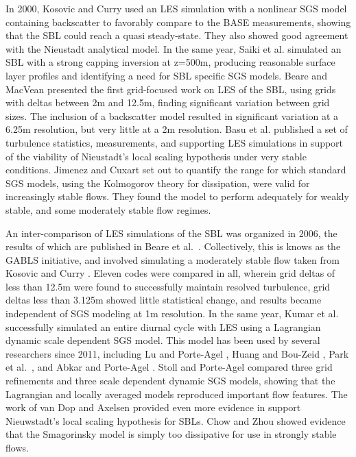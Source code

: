 \documentclass[conf]{new-aiaa}
\begin{document}
In 2000, Kosovic and Curry \cite{Kosovic2000} used an LES simulation with a nonlinear SGS 
model containing backscatter to favorably compare to the BASE measurements, showing that 
the SBL could reach a quasi steady-state. They also showed good agreement with the Nieustadt 
analytical model. In the same year, Saiki et al. \cite{Saiki2000} simulated an SBL with 
a strong capping inversion at z=500m, producing reasonable surface layer profiles and 
identifying a need for SBL specific SGS models. Beare and MacVean \cite{Beare2004} 
presented the first grid-focused work on LES of the SBL, using grids with deltas 
between 2m and 12.5m, finding significant variation between grid sizes. The inclusion 
of a backscatter model resulted in significant variation at a 6.25m resolution, but 
very little at a 2m resolution. Basu et al. \cite{Basu2005} published a set of 
turbulence statistics, measurements, and supporting LES simulations in support 
of the viability of Nieustadt's local scaling hypothesis under very stable 
conditions. Jimenez and Cuxart \cite{Jimenez2005} set out to quantify the range 
for which standard SGS models, using the Kolmogorov theory for dissipation, were 
valid for increasingly stable flows. They found the model to perform adequately 
for weakly stable, and some moderately stable flow regimes. 

An inter-comparison of LES simulations of the SBL was organized in 2006, the 
results of which are published in Beare et al.\ \cite{Beare2006}. Collectively, 
this is knows as the GABLS initiative, and involved simulating a moderately 
stable flow taken from Kosovic and Curry \cite{Kosovic2000}. Eleven codes 
were compared in all, wherein grid deltas of less than 12.5m were found to 
successfully maintain resolved turbulence, grid deltas less than 3.125m 
showed little statistical change, and results became independent of SGS 
modeling at 1m resolution. In the same year, Kumar et al. \cite{Kumar2006} 
successfully simulated an entire diurnal cycle with LES using a Lagrangian 
dynamic scale dependent SGS model. This model has been used by several 
researchers since 2011, including Lu and Porte-Agel \cite{Lu2011}, Huang 
and Bou-Zeid \cite{Huang2013}, Park et al.\ \cite{Park2014}, and 
Abkar and Porte-Agel \cite{Abkar2015}. Stoll and Porte-Agel \cite{Stoll2007} 
compared three grid refinements and three scale dependent dynamic SGS models, 
showing that the Lagrangian and locally averaged models reproduced important 
flow features. The work of van Dop and Axelsen \cite{vanDop2007} provided 
even more evidence in support Nieuwstadt's local scaling hypothesis for SBLs. 
Chow and Zhou \cite{Chow2011} showed evidence that the Smagorinsky model is 
simply too dissipative for use in strongly stable flows. 
\end{document}
